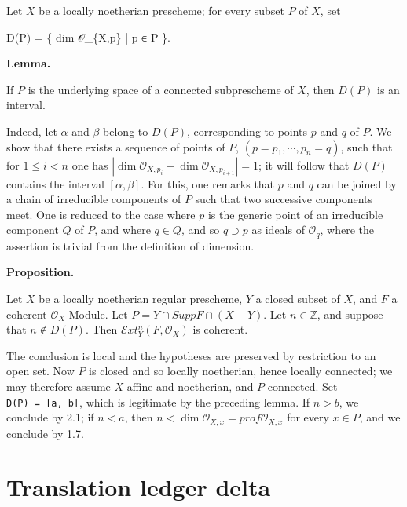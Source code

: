 \documentclass[
  11pt,
  a4paper,
]{book}
\newenvironment{Shaded}{}{}
\newcommand{\NormalTok}[1]{#1}
\begin{document}
Let \(X\) be a locally noetherian prescheme; for every subset \(P\) of
\(X\), set

\begin{Shaded}
\begin{Highlighting}[]
\NormalTok{D(P) = \{ dim 𝒪\_\{X,p\} | p ∈ P \}.}
\end{Highlighting}
\end{Shaded}

\textbf{Lemma.}

If \(P\) is the underlying space of a connected subprescheme of \(X\),
then \(D(P)\) is an interval.

Indeed, let \(\alpha\) and \(\beta\) belong to \(D(P)\), corresponding
to points \(p\) and \(q\) of \(P\). We show that there exists a sequence
of points of \(P\), \((p = p_{1}, \cdots, p_{n} = q)\), such that for
\(1 \leqslant i < n\) one has \(|\dim
\mathcal{O}_{X,p_{i}} - \dim \mathcal{O}_{X,p_{i+1}}| = 1\); it will
follow that \(D(P)\) contains the interval \([\alpha,
\beta]\). For this, one remarks that \(p\) and \(q\) can be joined by a
chain of irreducible components of \(P\) such that two successive
components meet. One is reduced to the case where \(p\) is the generic
point of an irreducible component \(Q\) of \(P\), and where \(q \in Q\),
and so \(q \supset p\) as ideals of \(\mathcal{O}_{q}\), where the
assertion is trivial from the definition of dimension.

\textbf{Proposition.}

Let \(X\) be a locally noetherian regular prescheme, \(Y\) a closed
subset of \(X\), and \(F\) a coherent \(\mathcal{O}_{X}\)-Module. Let
\(P = Y \cap Supp F \cap (X - Y)\). Let \(n \in \mathbb{Z}\), and
suppose that \(n \notin
D(P)\). Then \(\mathcal{E}xt^{n}_{Y}(F, \mathcal{O}_{X})\) is coherent.

The conclusion is local and the hypotheses are preserved by restriction
to an open set. Now \(P\) is closed and so locally noetherian, hence
locally connected; we may therefore assume \(X\) affine and noetherian,
and \(P\) connected. Set \texttt{D(P)\ =\ {[}a,\ b{[}}, which is
legitimate by the preceding lemma. If \(n > b\), we conclude by 2.1; if
\(n < a\), then \(n < \dim
\mathcal{O}_{X,x} = prof \mathcal{O}_{X,x}\) for every \(x \in P\), and
we conclude by 1.7.

\section{Translation ledger delta}\label{translation-ledger-delta}
\end{document}
